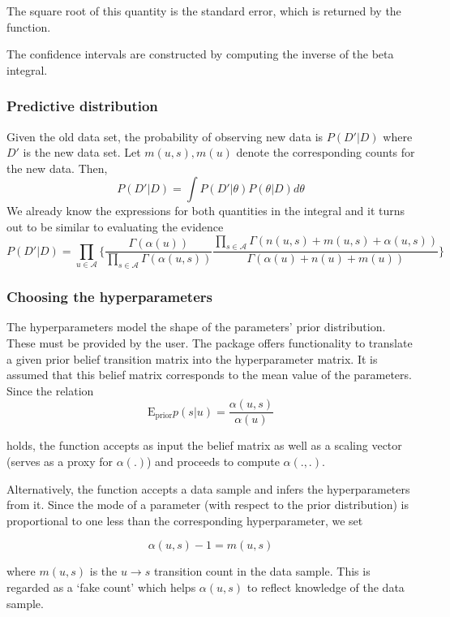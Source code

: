\documentclass[article,nojss]{jss}
\begin{document}
The square root of this quantity is the standard error, which is returned by the function.

The confidence intervals are constructed by computing the inverse of the beta integral.

\hypertarget{predictive-distribution}{%
\subsubsection{Predictive distribution}\label{predictive-distribution}}

Given the old data set, the probability of observing new data is \(P(D'|D)\) where \(D'\) is the new data set. Let \(m(u, s), m(u)\) denote the corresponding counts for the new data. Then,
\[
P(D'|D) = \int P(D' | \theta) P(\theta | D) d\theta
\]
We already know the expressions for both quantities in the integral and it turns out to be similar to evaluating the evidence
\[
P(D'|D) = \prod_{u \in \mathcal{A}} \Big\{ \frac{\Gamma(\alpha(u))}{\prod_{s \in \mathcal{A}} \Gamma(\alpha(u, s))} \frac{\prod_{s \in \mathcal{A}} \Gamma(n(u, s) + m(u, s) + \alpha(u, s))}{\Gamma(\alpha(u) + n(u) + m(u))} \Big\}
\]

\hypertarget{choosing-the-hyperparameters}{%
\subsubsection{Choosing the hyperparameters}\label{choosing-the-hyperparameters}}

The hyperparameters model the shape of the parameters' prior distribution. These must be provided by the user. The package offers functionality to translate a given prior belief transition matrix into the hyperparameter matrix. It is assumed that this belief matrix corresponds to the mean value of the parameters. Since the relation
\[
\text{E}_{\text{prior}} p(s | u) = \frac{\alpha(u, s)}{\alpha(u)}
\]

holds, the function accepts as input the belief matrix as well as a scaling vector (serves as a proxy for \(\alpha(.)\)) and proceeds to compute \(\alpha(., .)\).

Alternatively, the function accepts a data sample and infers the hyperparameters from it. Since the mode of a parameter (with respect to the prior distribution) is proportional to one less than the corresponding hyperparameter, we set

\[
\alpha(u, s) - 1 = m(u, s)
\]

where \(m(u, s)\) is the \(u\rightarrow s\) transition count in the data sample. This is regarded as a `fake count' which helps \(\alpha(u, s)\) to reflect knowledge of the data sample.
\end{document}
